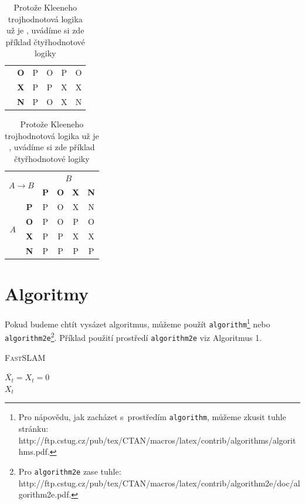 \documentclass[11pt, a4paper]{article}
\begin{document}
\begin{table}[ht]
\begin{center}
\begin{tabular}{|c|c|c|c|c|c|}
\cline{2-6}
& {\textbf{O}} & P & O & P & O \\ 
\cline{2-6}
& {\textbf{X}} & P & P & X & X \\ 
\cline{2-6}
& {\textbf{N}} & P & O & X & N \\ 
\hline
\end{tabular}
\begin{tabular}{|c|c|c|c|c|c|}
\hline
\multicolumn{2}{|c|}{\multirow{2}{*}{$A \rightarrow B$}} & \multicolumn{4}{|c|}{$B$} \\ 
\cline{3-6}
\multicolumn{2}{|c|}{} & {\textbf{P}} & {\textbf{O}} & {\textbf{X}} & {\textbf{N}} \\ 
\hline
\multirow{4}{*}{$A$} 
& {\textbf{P}} & P & O & X & N \\
\cline{2-6}
& {\textbf{O}} & P & O & P & O \\ 
\cline{2-6}
& {\textbf{X}} & P & P & X & X \\ 
\cline{2-6}
& {\textbf{N}} & P & P & P & P \\ 
\hline
\end{tabular}
\caption{Protože Kleeneho trojhodnotová logika už je , uvádíme si zde příklad čtyřhodnotové logiky}
\label{secondTable}
\end{center}
\end{table}

\section{Algoritmy}
Pokud budeme chtít vysázet algoritmus, můžeme použít \verb|algorithm|\footnote{Pro nápovědu, jak zacházet s~prostředím \texttt{algorithm}, můžeme zkusit tuhle stránku:
\newline http://ftp.cstug.cz/pub/tex/CTAN/macros/latex/contrib/algorithms/algorithms.pdf.} nebo \verb|algorithm2e|\footnote{Pro \texttt{algorithm2e} zase tuhle: http://ftp.cstug.cz/pub/tex/CTAN/macros/latex/contrib/algorithm2e/doc/algorithm2e.pdf.}. Příklad použití prostředí \verb|algorithm2e| viz Algoritmus 1.

\IncMargin{1.5em}
\begin{algorithm}
\caption{\textsc{FastSLAM}}
\label{firstAlgorithm}
\SetAlgoNoLine
\SetNlSty{}{}{:}
\Indm
{}
\Indentp{1.6em}
$\overline{X_t} = X_t = 0$\\
\Return $X_t$

\end{algorithm}
\DecMargin{1.5em}
\end{document}
